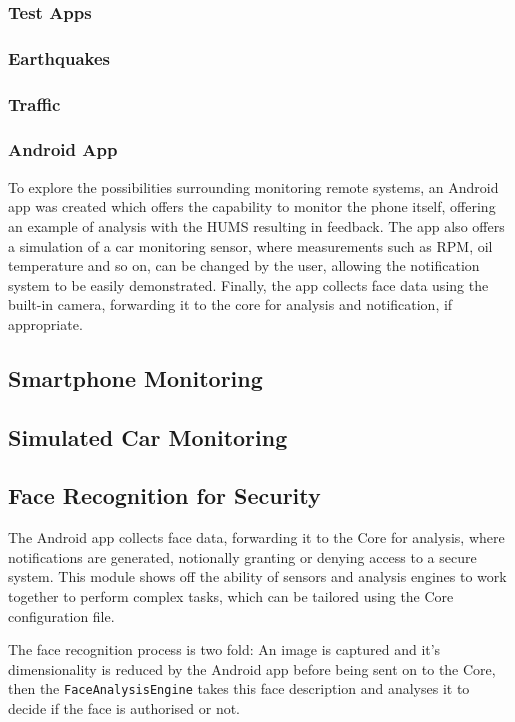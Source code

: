 \documentclass[10pt,a4paper]{article}
\begin{document}
\subsubsection{Test Apps}

\subsubsection{Earthquakes}

\subsubsection{Traffic}

\subsubsection{Android App}
To explore the possibilities surrounding monitoring remote systems, an Android app was created which offers the capability to monitor the phone itself, offering an example of analysis with the HUMS resulting in feedback. The app also offers a simulation of a car monitoring sensor, where measurements such as RPM, oil temperature and so on, can be changed by the user, allowing the notification system to be easily demonstrated. Finally, the app collects face data using the built-in camera, forwarding it to the core for analysis and notification, if appropriate.

\subsection{Smartphone Monitoring}

\subsection{Simulated Car Monitoring}

\subsection{Face Recognition for Security}
The Android app collects face data, forwarding it to the Core for analysis, where notifications are generated, notionally granting or denying access to a secure system. This module shows off the ability of sensors and analysis engines to work together to perform complex tasks, which can be tailored using the Core configuration file.

The face recognition process is two fold: An image is captured and it's dimensionality is reduced by the Android app before being sent on to the Core, then the \texttt{FaceAnalysisEngine} takes this face description and analyses it to decide if the face is authorised or not.
\end{document}
